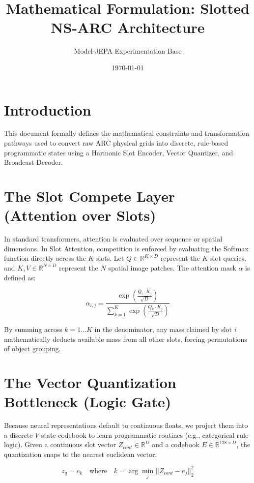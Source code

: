 \documentclass[11pt,a4paper]{article}
\title{\textbf{Mathematical Formulation: Slotted NS-ARC Architecture}}
\author{Model-JEPA Experimentation Base}
\date{\today}
\begin{document}
\maketitle

\section{Introduction}
This document formally defines the mathematical constraints and transformation pathways used to convert raw ARC physical grids into discrete, rule-based programmatic states using a Harmonic Slot Encoder, Vector Quantizer, and Broadcast Decoder.

\section{The Slot Compete Layer (Attention over Slots)}
In standard transformers, attention is evaluated over sequence or spatial dimensions. In Slot Attention, competition is enforced by evaluating the Softmax function directly across the $K$ slots. Let $Q \in \mathbb{R}^{K \times D}$ represent the $K$ slot queries, and $K, V \in \mathbb{R}^{N \times D}$ represent the $N$ spatial image patches. The attention mask $\alpha$ is defined as:

\begin{equation}
\alpha_{i,j} = \frac{\exp\left(\frac{Q_i \cdot K_j}{\sqrt{D}}\right)}{\sum_{k=1}^K \exp\left(\frac{Q_k \cdot K_j}{\sqrt{D}}\right)}
\end{equation}

By summing across $k=1 \dots K$ in the denominator, any mass claimed by slot $i$ mathematically deducts available mass from all other slots, forcing permutations of object grouping.

\section{The Vector Quantization Bottleneck (Logic Gate)}
Because neural representations default to continuous floats, we project them into a discrete $V$-state codebook to learn programmatic routines (e.g., categorical rule logic). Given a continuous slot vector $Z_{cont} \in \mathbb{R}^{D}$ and a codebook $E \in \mathbb{R}^{128 \times D}$, the quantization snaps to the nearest euclidean vector:

\begin{equation}
z_q = e_k \quad \text{where} \quad k = \arg\min_j || Z_{cont} - e_j ||_2^2
\end{equation}
\end{document}
